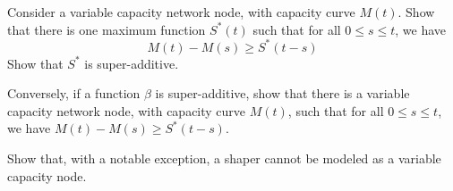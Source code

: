 \begin{problem}
Consider a variable capacity network node, with capacity curve
$M(t)$. Show that there is one maximum function $S^*(t)$ such that
for all $0 \leq s \leq t$, we have
$$M(t)-M(s) \geq S^*(t-s)
$$
Show that $S^*$ is super-additive.

Conversely, if a function $\beta$ is super-additive, show that
there is a variable capacity network node, with capacity curve
$M(t)$, such that for all $0 \leq s \leq t$, we have $M(t)-M(s)
\geq S^*(t-s) $.

Show that, with a notable exception, a shaper cannot be modeled as
a variable capacity node.
\end{problem}
